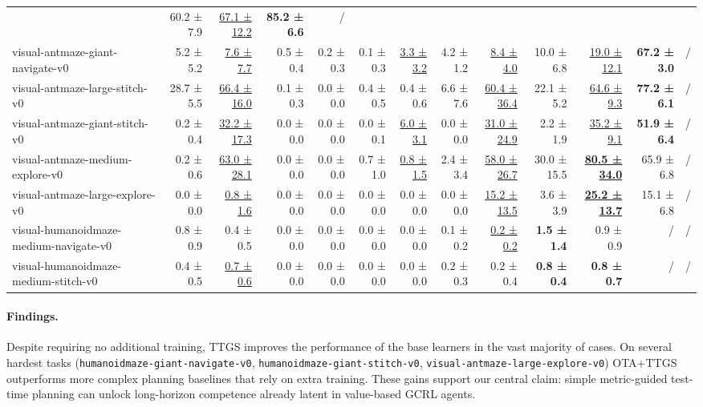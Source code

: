 \documentclass{article} %
\begin{document}
\begin{table}[ht]
\begin{tabular*}{\linewidth}{@{\extracolsep{\fill}} l 
    r r  %
    r r  %
    r r  %
    r r  %
    r r  %
    r    %
    r    %
}
& 60.2 ± 7.9             & \underline{67.1 ± 12.2}
& \textbf{85.2 ± 6.6} & / \\
visual-antmaze-giant-navigate-v0 
& 5.2 ± 5.2 & \underline{7.6 ± 7.7} 
& 0.5 ± 0.4 & 0.2 ± 0.3                     
& 0.1 ± 0.3   & \underline{3.3 ± 3.2}        
& 4.2 ± 1.2 & \underline{8.4 ± 4.0} 
& 10.0 ± 6.8 & \underline{19.0 ± 12.1}
& \textbf{67.2 ± 3.0} & / \\
visual-antmaze-large-stitch-v0 
& 28.7 ± 5.5 & \underline{66.4 ± 16.0} 
& 0.1 ± 0.3 & 0.0 ± 0.0                     
& 0.4 ± 0.5   & 0.4 ± 0.6                    
& 6.6 ± 7.6 & \underline{60.4 ± 36.4} 
& 22.1 ± 5.2 &  \underline{64.6 ± 9.3}
& \textbf{77.2 ± 6.1} & / \\
visual-antmaze-giant-stitch-v0 
& 0.2 ± 0.4 & \underline{32.2 ± 17.3} 
& 0.0 ± 0.0 & 0.0 ± 0.0                     
& 0.0 ± 0.1   & \underline{6.0 ± 3.1}        
& 0.0 ± 0.0 & \underline{31.0 ± 24.9} 
& 2.2 ± 1.9 &  \underline{35.2 ± 9.1}
& \textbf{51.9 ± 6.4} & / \\
visual-antmaze-medium-explore-v0 
& 0.2 ± 0.6 & \underline{63.0 ± 28.1} 
& 0.0 ± 0.0 & 0.0 ± 0.0                  
& 0.7 ± 1.0   & \underline{0.8 ± 1.5}        
& 2.4 ± 3.4 & \underline{58.0 ± 26.7} 
&  30.0 ± 15.5  & \textbf{\underline{80.5 ± 34.0}}
& 65.9 ± 6.8 & / \\
visual-antmaze-large-explore-v0 
& 0.0 ± 0.0 & \underline{0.8 ± 1.6} 
& 0.0 ± 0.0 & 0.0 ± 0.0                      
& 0.0 ± 0.0   & 0.0 ± 0.0                    
& 0.0 ± 0.0 & \underline{15.2 ± 13.5} 
&  3.6 ± 3.9 &  \textbf{\underline{25.2 ± 13.7}}
& 15.1 ± 6.8 & / \\
\midrule
visual-humanoidmaze-medium-navigate-v0 
& 0.8 ± 0.9 & 0.4 ± 0.5 
& 0.0 ± 0.0 & 0.0 ± 0.0                    
& 0.0 ± 0.0   & 0.0 ± 0.0                    
& 0.1 ± 0.2 & \underline{0.2 ± 0.2} 
& \textbf{1.5 ± 1.4} & 0.9 ± 0.9
& / & / \\
visual-humanoidmaze-medium-stitch-v0 
& 0.4 ± 0.5 & \underline{0.7 ± 0.6} 
& 0.0 ± 0.0 & 0.0 ± 0.0                   
& 0.0 ± 0.0 & 0.0 ± 0.0                    
& 0.2 ± 0.3 & 0.2 ± 0.4 
& \textbf{0.8 ± 0.4} & \textbf{0.8 ± 0.7}
& / & / \\
\bottomrule
\end{tabular*}
\end{table}

\paragraph{Findings.}
Despite requiring no additional training, TTGS improves the performance of the base learners in the vast majority of cases. On several hardest tasks (\texttt{humanoidmaze-giant-navigate-v0}, \texttt{humanoidmaze-giant-stitch-v0}, \texttt{visual-antmaze-large-explore-v0}) OTA+TTGS outperforms more complex planning baselines that rely on extra training. These gains support our central claim: simple metric-guided test-time planning can unlock long-horizon competence already latent in value-based GCRL agents. 
\end{document}
